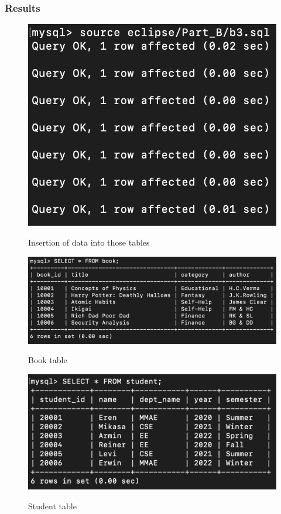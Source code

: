 \documentclass[12pt]{article}
\begin{document}
\newpage

\subsubsection{Results}
\begin{figure}[!hbt]
    \centering
    \includegraphics[scale=1.1]{screenshots/b2_01.png}
    \label{fig:my_label1}
    \caption{Insertion of data into those tables}
\end{figure}

\begin{figure}[!hbt]
    \centering
    \includegraphics[scale=0.75]{screenshots/b2_02.png}
    \label{fig:my_label1}
    \caption{Book table}
\end{figure}

\newpage

\begin{figure}[!hbt]
    \centering
    \includegraphics[scale=0.9]{screenshots/b2_03.png}
    \label{fig:my_label1}
    \caption{Student table}
\end{figure}
\end{document}

